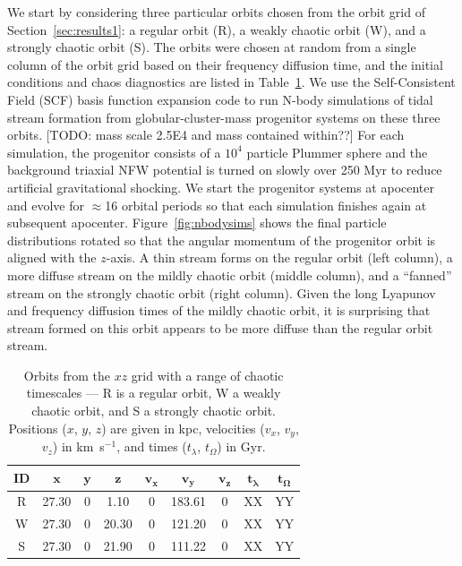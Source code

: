 \documentclass[letterpaper,12pt,preprint]{aastex}
\newcommand{\bs}[1]{\boldsymbol{#1}}
\begin{document}
We start by considering three particular orbits chosen from the orbit grid of Section~\ref{sec:results1}: a regular orbit (R), a weakly chaotic orbit (W), and a strongly chaotic orbit (S). The orbits were chosen at random from a single column of the orbit grid based on their frequency diffusion time, and the initial conditions and chaos diagnostics are listed in Table~\ref{tbl:three-orbits}. We use the Self-Consistent Field (SCF) basis function expansion code \citep{hernquist92} to run N-body simulations of tidal stream formation from globular-cluster-mass progenitor systems on these three orbits. [TODO: mass scale 2.5E4 and mass contained within??] For each simulation, the progenitor consists of a $10^4$ particle Plummer sphere and the background triaxial NFW potential is turned on slowly over 250 Myr to reduce artificial gravitational shocking. We start the progenitor systems at apocenter and evolve for $\approx$16 orbital periods so that each simulation finishes again at subsequent apocenter. Figure~\ref{fig:nbodysims} shows the final particle distributions rotated so that the angular momentum of the progenitor orbit is aligned with the $z$-axis. A thin stream forms on the regular orbit (left column), a more diffuse stream on the mildly chaotic orbit (middle column), and a ``fanned'' stream on the strongly chaotic orbit (right column). Given the long Lyapunov and frequency diffusion times of the mildly chaotic orbit, it is surprising that stream formed on this orbit appears to be more diffuse than the regular orbit stream. 

\begin{table}[ht]
\begin{center}
	\begin{tabular}{c | c c c c c c | c c }
		{\bf ID} & $\bs{x}$ & $\bs{y}$ & $\bs{z}$ & $\bs{v_x}$ & $\bs{v_y}$ & $\bs{v_z}$ & $\bs{t_\lambda}$ & $\bs{t_\Omega}$ \\\toprule
		R & 27.30 & 0 & 1.10 & 0 & 183.61 & 0 & XX & YY\\
		\midrule
		W & 27.30 & 0 & 20.30 & 0 & 121.20 & 0 & XX & YY\\
		\midrule
		S & 27.30 & 0 & 21.90 & 0 & 111.22 & 0 & XX & YY\\
		\bottomrule
		\end{tabular}
	\caption{Orbits from the $xz$ grid with a range of chaotic timescales --- R is a regular orbit, W a weakly chaotic orbit, and S a strongly chaotic orbit. Positions ($x$, $y$, $z$) are given in kpc, velocities ($v_x$, $v_y$, $v_z$) in km~s$^{-1}$, and times ($t_\lambda$, $t_\Omega$) in Gyr. \label{tbl:three-orbits}}
\end{center}
\end{table}
\end{document}
